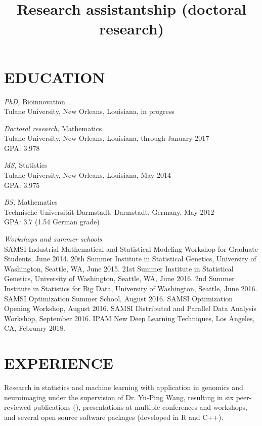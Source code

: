 \documentclass[overlapped, line, 10pt]{res} %
\begin{document}
\begin{resume}

\section{EDUCATION}

{\sl PhD,} Bioinnovation \\
Tulane University, New Orleans, Louisiana, in progress

{\sl Doctoral research,} Mathematics \\
Tulane University, New Orleans, Louisiana, through January 2017\\
GPA: 3.978

{\sl MS,} Statistics \\
Tulane University, New Orleans, Louisiana, May 2014\\
GPA: 3.975

{\sl BS,} Mathematics\\
Technische Universit\"{a}t Darmstadt, Darmstadt, Germany, May 2012\\
GPA: 3.7 (1.54 German grade)

{\sl Workshops and summer schools}\\
SAMSI Industrial Mathematical and Statistical Modeling Workshop for Graduate Students, June 2014.
20th Summer Institute in Statistical Genetics, University of Washington, Seattle, WA, June 2015.
21st Summer Institute in Statistical Genetics, University of Washington, Seattle, WA, June 2016.
2nd Summer Institute in Statistics for Big Data, University of Washington, Seattle, June 2016.
SAMSI Optimization Summer School, August 2016.
SAMSI Optimization Opening Workshop, August 2016.
SAMSI Distributed and Parallel Data Analysis Workshop, September 2016.
IPAM New Deep Learning Techniques, Los Angeles, CA, February 2018.


\section{EXPERIENCE}

\title{Research assistantship (doctoral research)}
\begin{position}
  Research in statistics and machine learning with application in genomics and neuroimaging under the supervision of Dr. Yu-Ping Wang, resulting in six peer-reviewed publications (\cite{gossmann2015, cao2015BCB, cao2015bioinformatics, Gossmann2017-yu, Gossmann2017-ln, brzyski2016}), presentations at multiple conferences and workshops, and several open source software packages (developed in R and C++).
\end{position}


\end{resume}
\end{document}
